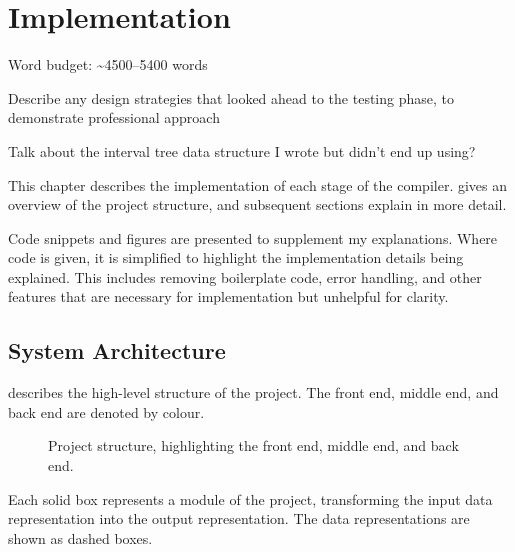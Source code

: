 \documentclass[00-main.tex]{subfiles}
\begin{document}
\chapter{Implementation}

\begin{mrwComment}
Word budget: \textasciitilde4500--5400 words
\end{mrwComment}

\begin{mrwComment}
Describe any design strategies that looked ahead to the testing phase, to demonstrate professional approach
\end{mrwComment}
\begin{mrwComment}
  Talk about the interval tree data structure I wrote but didn't end up using?
\end{mrwComment}

This chapter describes the implementation of each stage of the compiler.
 gives an overview of the project structure, and subsequent sections explain in more detail.

Code snippets and figures are presented to supplement my explanations.
Where code is given, it is simplified to highlight the implementation details being explained.
This includes removing boilerplate code, error handling, and other features that are necessary for implementation but unhelpful for clarity.

\section{System Architecture}\label{sec:impl:system architecture}

 describes the high-level structure of the project. The \textcolor{frontendcolor}{front end}, \textcolor{middleendcolor}{middle end}, and \textcolor{backendcolor}{back end} are denoted by colour.

\begin{figure}[t]
  \centering
  \caption{Project structure, highlighting the \textcolor{frontendcolor}{front end}, \textcolor{middleendcolor}{middle end}, and \textcolor{backendcolor}{back end}.}
  \label{fig:project flowchart} %
\end{figure}

Each solid box represents a module of the project, transforming the input data representation into the output representation.
The data representations are shown as dashed boxes.
\end{document}
